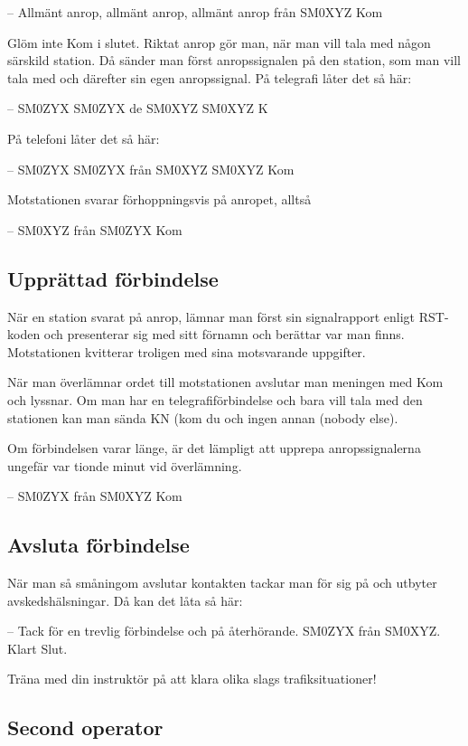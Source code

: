 -- Allmänt anrop, allmänt anrop, allmänt anrop från SM0XYZ Kom

Glöm inte Kom i slutet.
Riktat anrop gör man, när man vill tala med någon särskild station.
Då sänder man först anropssignalen på den station, som man vill tala med och
därefter sin egen anropssignal.
På telegrafi låter det så här:

-- SM0ZYX SM0ZYX de SM0XYZ SM0XYZ K

På telefoni låter det så här:

-- SM0ZYX SM0ZYX från SM0XYZ SM0XYZ Kom

Motstationen svarar förhoppningsvis på anropet, alltså

-- SM0XYZ från SM0ZYX Kom

\subsection{Upprättad förbindelse}

När en station svarat på anrop, lämnar man först sin signalrapport
enligt RST-koden och presenterar sig med sitt förnamn och berättar var man finns.
Motstationen kvitterar troligen med sina motsvarande uppgifter.

När man överlämnar ordet till motstationen avslutar man meningen med Kom och lyssnar.
Om man har en telegrafiförbindelse och bara vill tala med den stationen kan man
sända KN (kom du och ingen annan (nobody else).

Om förbindelsen varar länge, är det lämpligt att upprepa anropssignalerna
ungefär var tionde minut vid överlämning.

-- SM0ZYX från SM0XYZ Kom

\subsection{Avsluta förbindelse}

När man så småningom avslutar kontakten tackar man för sig på och utbyter
avskedshälsningar. Då kan det låta så här:

-- Tack för en trevlig förbindelse och på återhörande. SM0ZYX från
SM0XYZ. Klart Slut.

Träna med din instruktör på att klara olika slags trafiksituationer!

\subsection{Second operator}
\label{secondoperator}

